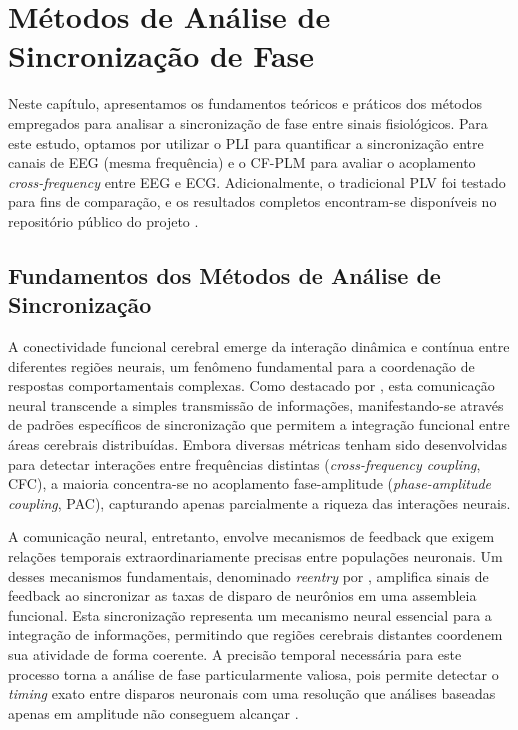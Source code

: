 \chapter{Métodos de Análise de Sincronização de Fase}
\label{chap:6_metodos_de_analise_de_sincronizacao_de_fase}
Neste capítulo, apresentamos os fundamentos teóricos e práticos dos métodos empregados para analisar a sincronização de fase entre sinais fisiológicos. Para este estudo, optamos por utilizar o PLI para quantificar a sincronização entre canais de EEG (mesma frequência) e o CF-PLM para avaliar o acoplamento \textit{cross-frequency} entre EEG e ECG. Adicionalmente, o tradicional PLV foi testado para fins de comparação, e os resultados completos encontram-se disponíveis no repositório público do projeto \cite{barros2025repository}.

\section{Fundamentos dos Métodos de Análise de Sincronização}
A conectividade funcional cerebral emerge da interação dinâmica e contínua entre diferentes regiões neurais, um fenômeno fundamental para a coordenação de respostas comportamentais complexas. Como destacado por , esta comunicação neural transcende a simples transmissão de informações, manifestando-se através de padrões específicos de sincronização que permitem a integração funcional entre áreas cerebrais distribuídas. Embora diversas métricas tenham sido desenvolvidas para detectar interações entre frequências distintas (\textit{cross-frequency coupling}, CFC), a maioria concentra-se no acoplamento fase-amplitude (\textit{phase-amplitude coupling}, PAC), capturando apenas parcialmente a riqueza das interações neurais.

A comunicação neural, entretanto, envolve mecanismos de feedback que exigem relações temporais extraordinariamente precisas entre populações neuronais. Um desses mecanismos fundamentais, denominado \emph{reentry} por , amplifica sinais de feedback ao sincronizar as taxas de disparo de neurônios em uma assembleia funcional. Esta sincronização representa um mecanismo neural essencial para a integração de informações, permitindo que regiões cerebrais distantes coordenem sua atividade de forma coerente. A precisão temporal necessária para este processo torna a análise de fase particularmente valiosa, pois permite detectar o \textit{timing} exato entre disparos neuronais com uma resolução que análises baseadas apenas em amplitude não conseguem alcançar \cite{seraj2018cerebral, ren2022multi}.

